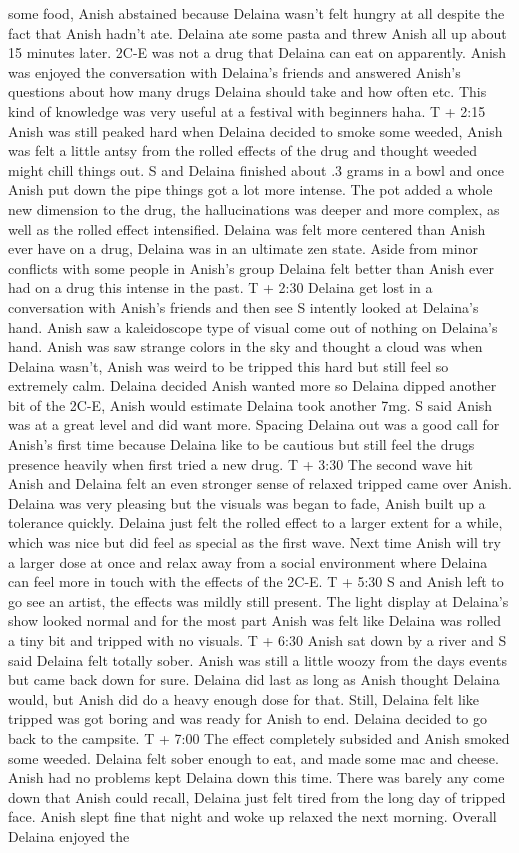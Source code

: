 \documentclass[12pt]{book}
\begin{document}
some food, Anish abstained because Delaina wasn't felt hungry at all despite the fact that Anish hadn't ate. Delaina ate some pasta and threw Anish all up about 15 minutes later. 2C-E was not a drug that Delaina can eat on apparently. Anish was enjoyed the conversation with Delaina's friends and answered Anish's questions about how many drugs Delaina should take and how often etc. This kind of knowledge was very useful at a festival with beginners haha. T + 2:15 Anish was still peaked hard when Delaina decided to smoke some weeded, Anish was felt a little antsy from the rolled effects of the drug and thought weeded might chill things out. S and Delaina finished about .3 grams in a bowl and once Anish put down the pipe things got a lot more intense. The pot added a whole new dimension to the drug, the hallucinations was deeper and more complex, as well as the rolled effect intensified. Delaina was felt more centered than Anish ever have on a drug, Delaina was in an ultimate zen state. Aside from minor conflicts with some people in Anish's group Delaina felt better than Anish ever had on a drug this intense in the past. T + 2:30 Delaina get lost in a conversation with Anish's friends and then see S intently looked at Delaina's hand. Anish saw a kaleidoscope type of visual come out of nothing on Delaina's hand. Anish was saw strange colors in the sky and thought a cloud was when Delaina wasn't, Anish was weird to be tripped this hard but still feel so extremely calm. Delaina decided Anish wanted more so Delaina dipped another bit of the 2C-E, Anish would estimate Delaina took another 7mg. S said Anish was at a great level and did want more. Spacing Delaina out was a good call for Anish's first time because Delaina like to be cautious but still feel the drugs presence heavily when first tried a new drug. T + 3:30 The second wave hit Anish and Delaina felt an even stronger sense of relaxed tripped came over Anish. Delaina was very pleasing but the visuals was began to fade, Anish built up a tolerance quickly. Delaina just felt the rolled effect to a larger extent for a while, which was nice but did feel as special as the first wave. Next time Anish will try a larger dose at once and relax away from a social environment where Delaina can feel more in touch with the effects of the 2C-E. T + 5:30 S and Anish left to go see an artist, the effects was mildly still present. The light display at Delaina's show looked normal and for the most part Anish was felt like Delaina was rolled a tiny bit and tripped with no visuals. T + 6:30 Anish sat down by a river and S said Delaina felt totally sober. Anish was still a little woozy from the days events but came back down for sure. Delaina did last as long as Anish thought Delaina would, but Anish did do a heavy enough dose for that. Still, Delaina felt like tripped was got boring and was ready for Anish to end. Delaina decided to go back to the campsite. T + 7:00 The effect completely subsided and Anish smoked some weeded. Delaina felt sober enough to eat, and made some mac and cheese. Anish had no problems kept Delaina down this time. There was barely any come down that Anish could recall, Delaina just felt tired from the long day of tripped face. Anish slept fine that night and woke up relaxed the next morning. Overall Delaina enjoyed the 
\end{document}
